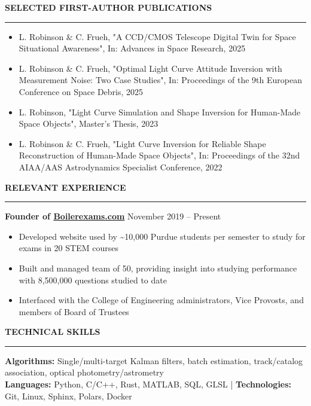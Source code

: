 \documentclass[10pt, a4paper]{article}
\newcommand{\sectiontitle}[1]{{\Large \textbf{#1}}\vspace{0.5em}\hrule\vspace{0.5em}}
\begin{document}
\sectiontitle{SELECTED FIRST-AUTHOR PUBLICATIONS}
\begin{itemize}[noitemsep]
    \item L. Robinson \& C. Frueh, "A CCD/CMOS Telescope Digital Twin for Space Situational Awareness", In: Advances in Space Research, 2025
    \item L. Robinson \& C. Frueh, "Optimal Light Curve Attitude Inversion with Measurement Noise: Two Case Studies", In: Proceedings of the 9th European Conference on Space Debris, 2025
    \item L. Robinson, "Light Curve Simulation and Shape Inversion for Human-Made Space Objects", Master's Thesis, 2023
    \item L. Robinson \& C. Frueh, "Light Curve Inversion for Reliable Shape Reconstruction of Human-Made Space Objects", In: Proceedings of the 32nd AIAA/AAS Astrodynamics Specialist Conference, 2022
\end{itemize}

\sectiontitle{RELEVANT EXPERIENCE}
\textbf{Founder of \href{https://boilerexams.com}{Boilerexams.com}} \hfill November 2019 -- Present
\begin{itemize}[noitemsep]
    \item Developed website used by \textasciitilde10,000 Purdue students per semester to study for exams in 20 STEM courses
    \item Built and managed team of 50, providing insight into studying performance with 8,500,000 questions studied to date
    \item Interfaced with the College of Engineering administrators, Vice Provosts, and members of Board of Trustees
\end{itemize}

\sectiontitle{TECHNICAL SKILLS}
\textbf{Algorithms:} Single/multi-target Kalman filters, batch estimation, track/catalog association, optical photometry/astrometry \\
\textbf{Languages:} Python, C/C++, Rust, MATLAB, SQL, GLSL | \textbf{Technologies:} Git, Linux, Sphinx, Polars, Docker \\
\end{document}
